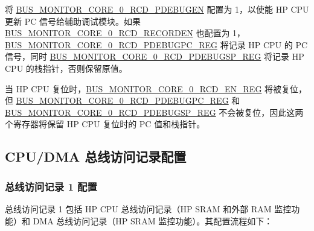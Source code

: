 \documentclass[main\_\_CN.tex]{subfiles}
\begin{document}
将 \hyperref[fielddesc:BUSMONITORCORE0RCDPDEBUGEN]{BUS\_MONITOR\_CORE\_0\_RCD\_PDEBUGEN} 配置为 1，以使能 HP CPU 更新 PC 信号给辅助调试模块。如果 \hyperref[fielddesc:BUSMONITORCORE0RCDRECORDEN]{BUS\_MONITOR\_CORE\_0\_RCD\_RECORDEN} 也配置为 1，\hyperref[regdesc:BUSMONITORCORE0RCDPDEBUGPCREG]{BUS\_MONITOR\_CORE\_0\_RCD\_PDEBUGPC\_REG} 将记录 HP CPU 的 PC 信号，同时 \hyperref[regdesc:BUSMONITORCORE0RCDPDEBUGSPREG]{BUS\_MONITOR\_CORE\_0\_RCD\_PDEBUGSP\_REG} 将记录 HP CPU 的栈指针，否则保留原值。

当 HP CPU 复位时，\hyperref[regdesc:BUSMONITORCORE0RCDENREG]{BUS\_MONITOR\_CORE\_0\_RCD\_EN\_REG} 将被复位，但 \hyperref[regdesc:BUSMONITORCORE0RCDPDEBUGPCREG]{BUS\_MONITOR\_CORE\_0\_RCD\_PDEBUGPC\_REG} 和 \hyperref[regdesc:BUSMONITORCORE0RCDPDEBUGSPREG]{BUS\_MONITOR\_CORE\_0\_RCD\_PDEBUGSP\_REG} 不会被复位，因此这两个寄存器将保留 HP CPU 复位时的 PC 值和栈指针。

\subsection{CPU/DMA 总线访问记录配置}

\subsubsection{总线访问记录 1 配置}
\label{sec:hp-cpu-access-mon}

总线访问记录 1 包括 HP CPU 总线访问记录（HP SRAM 和外部 RAM 监控功能）和 DMA 总线访问记录（HP SRAM 监控功能）。其配置流程如下：
\end{document}
